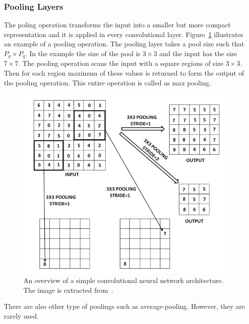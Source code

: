 \subsubsection{Pooling Layers}
The poling operation transforms the input into a smaller but more compact representation and it is applied in every convolutional layer. Figure~\ref{fig:cnn_pooling} illustrates an example of a pooling operation. The pooling layer takes a pool size such that $P_q \times P_q$. In the example the size of the pool is $3\times3$ and the input has the size $7\times7$. The pooling operation scans the input with a square regions of size $3\times3$. Then for each region maximum of these values is returned to form the output of the pooling operation. This entire operation is called as max pooling.
\begin{figure}[h]
\centering
 \includegraphics[width=\linewidth]{Figures/fig_cnn_pooling.png}
 \caption{An overview of a simple convolutional neural network architecture. The image is extracted from~\cite{DBLP:books/sp/Aggarwal18}.}
 \label{fig:cnn_pooling}
\end{figure}
There are also other type of poolings such as average-pooling. However, they are rarely used. 
